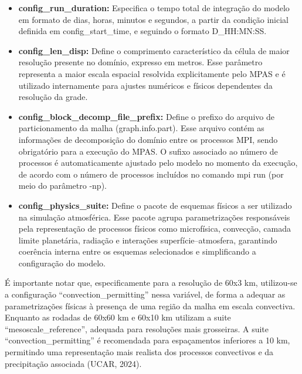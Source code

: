\documentclass[12pt,a4paper,oneside]{book}
\begin{document}
\begin{itemize}
\item
  \textbf{config\_run\_duration:} Especifica o tempo total de integração do modelo em formato de dias, horas, minutos e segundos, a partir da condição inicial definida em config\_start\_time, e seguindo o formato \textquotesingle D\_HH:MN:SS\textquotesingle.
\item
  \textbf{config\_len\_disp:} Define o comprimento característico da célula de maior resolução presente no domínio, expresso em metros. Esse parâmetro representa a maior escala espacial resolvida explicitamente pelo MPAS e é utilizado internamente para ajustes numéricos e físicos dependentes da resolução da grade.
\item
  \textbf{config\_block\_decomp\_file\_prefix:} Define o prefixo do arquivo de particionamento da malha (graph.info.part). Esse arquivo contém as informações de decomposição do domínio entre os processos MPI, sendo obrigatório para a execução do MPAS. O sufixo associado ao número de processos é automaticamente ajustado pelo modelo no momento da execução, de acordo com o número de processos incluídos no comando mpi run (por meio do parâmetro -np).
\item
  \textbf{config\_physics\_suite:} Define o pacote de esquemas físicos a ser utilizado na simulação atmosférica. Esse pacote agrupa parametrizações responsáveis pela representação de processos físicos como microfísica, convecção, camada limite planetária, radiação e interações superfície--atmosfera, garantindo coerência interna entre os esquemas selecionados e simplificando a configuração do modelo.
\end{itemize}

É importante notar que, especificamente para a resolução de 60x3 km, utilizou-se a configuração ``convection\_permitting'' nessa variável, de forma a adequar as parametrizações físicas à presença de uma região da malha em escala convectiva. Enquanto as rodadas de 60x60 km e 60x10 km utilizam a suite ``mesoscale\_reference'', adequada para resoluções mais grosseiras. A suite ``convection\_permitting'' é recomendada para espaçamentos inferiores a 10 km, permitindo uma representação mais realista dos processos convectivos e da precipitação associada (UCAR, 2024).
\end{document}
